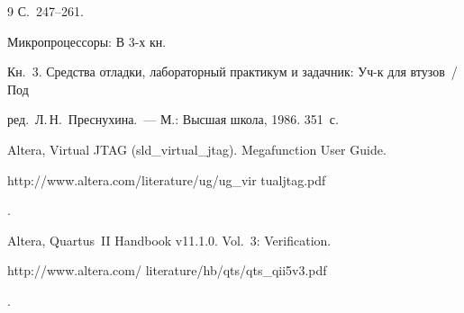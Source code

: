 {{\begin{thebibliography}{9}
С.~247--261.




 Микропроцессоры: В 3-х кн. 


Кн.~3. Средства отладки, лабораторный практикум и задачник: Уч-к для втузов~/ Под 


ред.\ Л.\,Н.~Преснухина.~--- М.: Высшая школа, 1986. 351~с. 




Altera, Virtual JTAG (sld\_virtual\_jtag). Megafunction User Guide. {\sf 


http://www.\linebreak altera.com/literature/ug/ug\_vir tualjtag.pdf}. 





    \label{end\stat}


    




Altera, Quartus~II Handbook v11.1.0. Vol.~3: Verification. {\sf 


http://www.altera.com/ literature/hb/qts/qts\_qii5v3.pdf}.


 \end{thebibliography}


}


}



